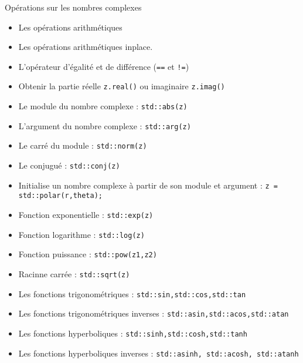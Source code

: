 \documentclass[compress,10pt,aspectratio=169]{beamer}
\begin{document}
\begin{frame}[fragile]{Opérations sur les nombres complexes}
    \scriptsize
    \begin{multicols}{2}
    \begin{itemize}
\item Les opérations arithmétiques
\item Les opérations arithmétiques inplace.
\item L'opérateur d'égalité et de différence (\texttt{==} et \texttt{!=})
\item Obtenir la partie réelle \texttt{z.real()} ou imaginaire \texttt{z.imag()}
\item Le module du nombre complexe : \texttt{std::abs(z)}
\item L'argument du nombre complexe : \texttt{std::arg(z)}
\item Le carré du module : \texttt{std::norm(z)}
\item Le conjugué : \texttt{std::conj(z)}
\item Initialise un nombre complexe à partir de son module et argument : \texttt{z = std::polar(r,theta);}
\item Fonction exponentielle : \texttt{std::exp(z)}
\item Fonction logarithme    : \texttt{std::log(z)}
\item Fonction puissance     : \texttt{std::pow(z1,z2)}
\item Racinne carrée         : \texttt{std::sqrt(z)}
\item Les fonctions trigonométriques : \texttt{std::sin,std::cos,std::tan}
\item Les fonctions trigonométriques inverses : \texttt{std::asin,std::acos,std::atan}
\item Les fonctions hyperboliques : \texttt{std::sinh,std::cosh,std::tanh}
\item Les fonctions hyperboliques inverses : \texttt{std::asinh, std::acosh, std::atanh}
    \end{itemize}
\end{multicols}
\end{frame}
\end{document}
